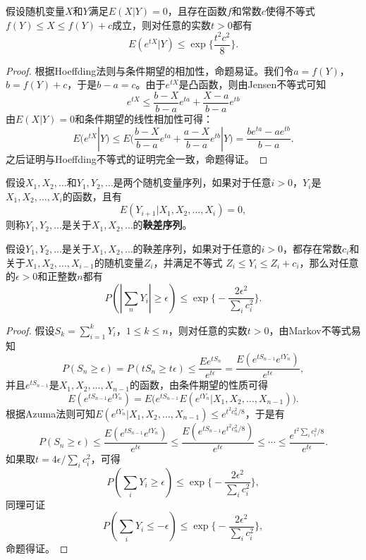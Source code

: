 \begin{lemma}[Azuma法则]
假设随机变量$X$和$Y$满足$E(X|Y)=0$，且存在函数$f$和常数$c$使得不等式$f(Y)\le X \le f(Y)+c$成立，则对任意的实数$t>0$都有
\begin{equation}
    E(e^{tX}|Y) \le \exp\{\frac{t^2c^2}{8}\}.
\end{equation}

\end{lemma}
\begin{proof}
根据Hoeffding法则与条件期望的相加性，命题易证。我们令$a = f(Y)$，$b = f(Y) + c$，于是$b - a = c$。由于$e^{tX}$是凸函数，则由Jensen不等式可知
\begin{equation}
  e^{tX} \le \frac{b-X}{b-a} e^{ta} + \frac{X-a}{b-a} e^{tb}
\end{equation}
由$E(X|Y)=0$和条件期望的线性相加性可得：
\begin{equation}
    E(e^{tX}|Y) \le E\bigg(\frac{b-X}{b-a} e^{ta} + \frac{a-X}{b-a}e^{tb} |Y\bigg) = \frac{b e^{ta}-a e^{tb}}{b-a}.
\end{equation}
之后证明与Hoeffding不等式的证明完全一致，命题得证。
\end{proof}

\begin{definition}[鞅差序列]
假设$X_1,X_2,\ldots$和$Y_1, Y_2,\ldots$是两个随机变量序列，如果对于任意$i>0$，$Y_i$是$X_1,X_2,\ldots,X_i$的函数，且有
\[
    E(Y_{i+1}|X_1,X_2,\ldots,X_i) = 0,
\]
则称$Y_1, Y_2,\ldots$是关于$X_1,X_2,\ldots$的\textbf{鞅差序列}。
\end{definition}

\begin{theorem}[Azuma不等式]
假设$Y_1, Y_2,\ldots$是关于$X_1,X_2,\ldots$的鞅差序列，如果对于任意的$i>0$，都存在常数$c_i$和关于$X_1,X_2,\ldots,X_{i-1}$的随机变量$Z_i$，并满足不等式
$Z_i\le Y_i \le Z_i + c_i$，那么对任意的$\epsilon>0$和正整数$n$都有
\[
    P(|\sum\limits_n Y_i| \ge \epsilon) \le \exp\big\{-\frac{2\epsilon^2}{\sum\limits_i c_i^2}\big\}.
\]
\end{theorem}

\begin{proof}
假设$S_k=\sum\limits_{i=1}^k Y_i$，$1\le k\le n$，则对任意的实数$t>0$，由Markov不等式易知
\[
    P(S_n\ge \epsilon) = P(tS_n\ge t\epsilon) \le \frac{E e^{tS_n}}{e^{t\epsilon}} = \frac{E (e^{tS_{n-1}} e^{tY_n})}{e^{t\epsilon}},
\]
并且$e^{tS_{n-1}}$是$X_1,X_2,\ldots,X_{n-1}$的函数，由条件期望的性质可得
\[
    E (e^{tS_{n-1}} e^{tY_n}) = E\big(e^{tS_{n-1}} E(e^{tY_n}|X_1,X_2,\ldots, X_{n-1})\big).
\]
根据Azuma法则可知$E(e^{tY_n}|X_1,X_2,\ldots, X_{n-1}) \le e^{t^2 c_n^2/8}$，于是有
\[
    P(S_n\ge \epsilon) \le \frac{E (e^{tS_{n-1}} e^{tY_n})}{e^{t\epsilon}} \le \frac{E (e^{tS_{n-1}} e^{t^2 c_n^2/8})}{e^{t\epsilon}} \le \cdots \le \frac{e^{t^2 \sum\limits_i c_i^2/8}}{e^{t\epsilon}}.
\]
如果取$t=4\epsilon /\sum\limits_i c_i^2$，可得
\[
    P(\sum\limits_i Y_i \ge \epsilon) \le \exp\big\{-\frac{2\epsilon^2}{\sum\limits_i c_i^2}\big\},
\]
同理可证
\[
    P(\sum\limits_i Y_i \le -\epsilon) \le \exp\big\{-\frac{2\epsilon^2}{\sum\limits_i c_i^2}\big\},
\]
命题得证。
\end{proof}

